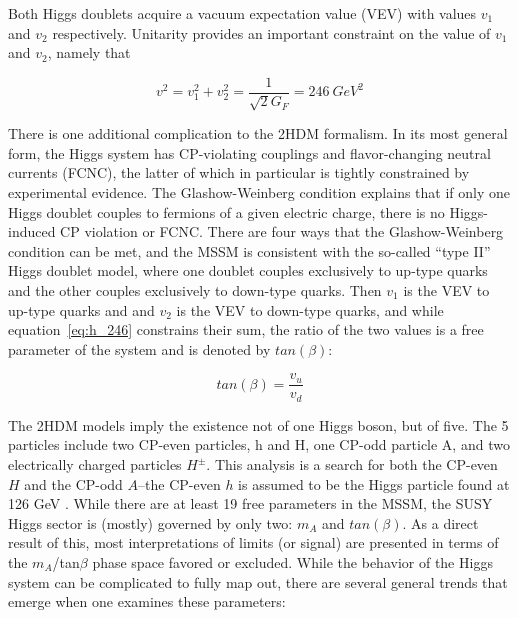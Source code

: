 

Both Higgs doublets acquire a vacuum expectation value (VEV) with values $v_1$ and $v_2$ respectively.  Unitarity provides an important constraint on the value of $v_1$ and $v_2$, namely that 

\begin{equation}
	v^2 = v_1^2 + v_2^2 = \frac{1}{\sqrt{2}G_F} = 246\ GeV^2
	\label{eq:h_246}
\end{equation}


There is one additional complication to the 2HDM formalism.  In its most general form, the Higgs system has CP-violating couplings and flavor-changing neutral currents (FCNC), the latter of which in particular is tightly constrained by experimental evidence.  The Glashow-Weinberg condition explains that if only one Higgs doublet couples to fermions of a given electric charge, there is no Higgs-induced CP violation or FCNC.  There are four ways that the Glashow-Weinberg condition can be met, and the MSSM is consistent with the so-called ``type II'' Higgs doublet model, where one doublet couples exclusively to up-type quarks and the other couples exclusively to down-type quarks.  Then $v_1$ is the VEV to up-type quarks and and $v_2$ is the VEV to down-type quarks, and while equation~\ref{eq:h_246} constrains their sum, the ratio of the two values is a free parameter of the system and is denoted by $tan(\beta)$:

\begin{equation}
	tan(\beta) = \frac{v_u}{v_d}
\end{equation}




The 2HDM models imply the existence not of one Higgs boson, but of five.  The 5 particles include two CP-even particles, h and H, one CP-odd particle A, and two electrically charged particles $H^\pm$.   This analysis is a search for both the CP-even $H$ and the CP-odd $A$--the CP-even $h$ is assumed to be the Higgs particle found at 126 GeV \cite{PDG-Review}.  While there are at least 19 free parameters in the MSSM, the SUSY Higgs sector is (mostly) governed by only two: $m_A$ and $tan(\beta)$.  As a direct result of this, most interpretations of limits (or signal) are presented in terms of the $m_A$/tan$\beta$ phase space favored or excluded.  While the behavior of the Higgs system can be complicated to fully map out, there are several general trends that emerge when one examines these parameters:

